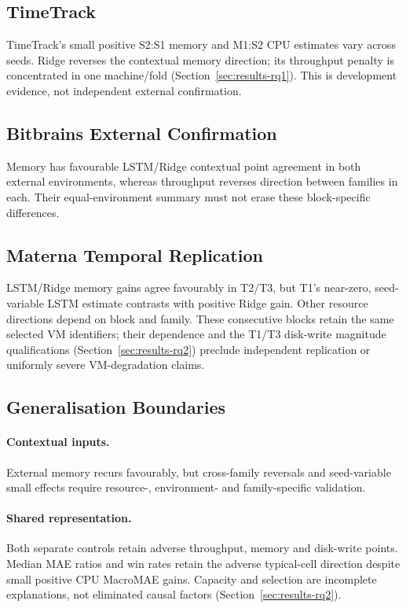 \documentclass[5p,twocolumn]{elsarticle}
\begin{document}
\subsection{TimeTrack}

TimeTrack's small positive S2:S1 memory and M1:S2 CPU estimates vary across
seeds. Ridge reverses the contextual memory direction; its throughput penalty
is concentrated in one machine/fold (Section~\ref{sec:results-rq1}).
This is development evidence, not independent external confirmation.

\subsection{Bitbrains External Confirmation}

Memory has favourable LSTM/Ridge contextual point agreement in both external
environments, whereas throughput reverses direction between families in each.
Their equal-environment summary must not erase these block-specific differences.

\subsection{Materna Temporal Replication}

LSTM/Ridge memory gains agree favourably in T2/T3, but T1's near-zero,
seed-variable LSTM estimate contrasts with positive Ridge gain. Other resource
directions depend on block and family. These consecutive blocks retain the
same selected VM identifiers; their dependence and the T1/T3 disk-write
magnitude qualifications (Section~\ref{sec:results-rq2}) preclude independent
replication or uniformly severe VM-degradation claims.

\subsection{Generalisation Boundaries}

\paragraph{Contextual inputs.}
External memory recurs favourably, but cross-family reversals and seed-variable
small effects require resource-, environment- and family-specific validation.

\paragraph{Shared representation.}
Both separate controls retain adverse throughput, memory and disk-write
points. Median MAE ratios and win rates retain the adverse typical-cell
direction despite small positive CPU MacroMAE gains. Capacity and selection
are incomplete explanations, not eliminated causal factors
(Section~\ref{sec:results-rq2}).
\end{document}
